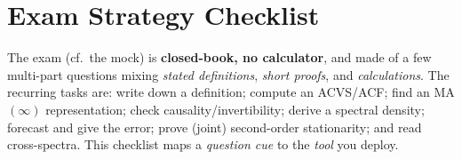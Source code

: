 \section{Exam Strategy Checklist}
\label{sec:strategy}

The exam (cf.\ the mock) is \textbf{closed-book, no calculator}, and made of a
few multi-part questions mixing \emph{stated definitions}, \emph{short proofs},
and \emph{calculations}. The recurring tasks are: write down a definition;
compute an ACVS/ACF; find an MA$(\infty)$ representation; check
causality/invertibility; derive a spectral density; forecast and give the
error; prove (joint) second-order stationarity; and read cross-spectra. This
checklist maps a \emph{question cue} to the \emph{tool} you deploy.

